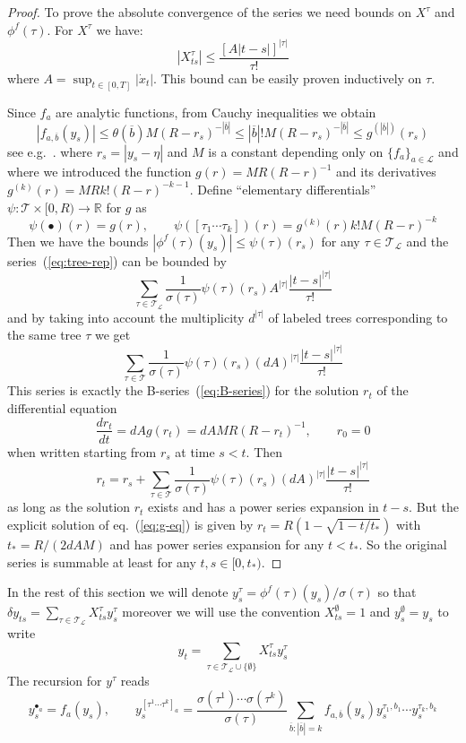 \documentclass[a4paper,11pt,reqno]{article}
\newcommand{\ol}[1]{\overline{#1}}
\newcommand{\1}{{\bf 1}}
\newcommand{\der}{\delta}
\newcommand{\RR}{\mathbb{R}}
\newcommand{\LL}{\mathcal{L}}
\newcommand{\TT}{\mathcal{T}}
\newcommand{\troot}{\bullet}
\begin{document}
\begin{proof}
To prove the absolute convergence of the series we need bounds on $X^\tau$ and $\phi^f(\tau)$. For  $X^\tau$ we have:
$$
|X^{\tau}_{ts}| \le \frac{[A|t-s|]^{|\tau|}}{\tau!}
$$
where $A = \sup_{t\in[0,T]} |\dot x_t|$. This bound can be easily proven inductively on $\tau$.

Since $f_a$ are analytic functions, from Cauchy inequalities we obtain
$$
|f_{a,\ol b}(y_s)| \le \theta(\ol b) M  (R-r_s)^{-|\ol b|} \le |\ol b|! M (R-r_s)^{-|\ol b|} \le g^{(|\ol b|)}(r_s)
$$
see e.g.~\cite[pag. 47]{MR1227985}.
where $r_s = |y_s-\eta|$ and $M$ is a constant depending only on $\{f_a\}_{a\in \LL}$ and where we introduced the function $g(r) = M R (R-r)^{-1}$ and its derivatives $g^{(k)}(r) = MR k! (R-r)^{-k-1}$.
Define ``elementary differentials'' $\psi:\TT \times [0,R) \to \RR$ for $g$ as
$$
\psi(\troot)(r) = g(r), \qquad \psi([\tau_1 \cdots \tau_k])(r) = g^{(k)}(r) k! M (R-r)^{-k} 
$$
Then we have the bounds $|\phi^f(\tau)(y_s)| \le \psi(\tau)(r_s)$ for
any $\tau \in \TT_\LL$ and the series~(\ref{eq:tree-rep}) can be
bounded by
$$
 \sum_{\tau \in \TT_\LL} \frac{1}{\sigma(\tau)} \psi(\tau)(r_s) A^{|\tau|} \frac{|t-s|^{|\tau|}}{\tau!} 
$$
and by taking into account the multiplicity $d^{|\tau|}$ of labeled
trees corresponding to the same tree  $\tau$ we get 
$$
\sum_{\tau \in \TT} \frac{1}{\sigma(\tau)} \psi(\tau)(r_s) (dA)^{|\tau|} \frac{|t-s|^{|\tau|}}{\tau!} 
$$
This series is exactly the B-series~(\ref{eq:B-series}) for the solution $r_t$ of the differential equation 
\begin{equation}
\label{eq:g-eq}
\frac{dr_t}{dt} = dA g(r_t) = d A M R (R-r_t)^{-1}, \qquad r_0 = 0
\end{equation}
when written starting from $r_s$ at time $s< t$. 
Then 
$$
r_t = r_s+ \sum_{\tau \in \TT} \frac{1}{\sigma(\tau)} \psi(\tau)(r_s) (dA)^{|\tau|} \frac{|t-s|^{|\tau|}}{\tau!}
$$
as long as the solution $r_t$ exists and has a power series expansion in $t-s$. But the explicit solution of eq.~(\ref{eq:g-eq}) is given by
$r_t = R(1-\sqrt{1-t/t_*})$ with $t_* = R/(2dAM)$ and has power series expansion for any $t < t_*$.
So the original series is summable at least for any $t,s \in [0,t_*)$.  
\end{proof}

In the rest of this section we will denote $y^\tau_s = \phi^f(\tau)(y_s)/\sigma(\tau)$ so that
$
\der y_{ts} = \sum_{\tau \in \TT_\LL} X^\tau_{ts} y^\tau_s
$
moreover we will use the convention $X^{\emptyset}_{ts} = 1$ and $y^\emptyset_s = y_s$ to write
$$
y_t = \sum_{\tau \in \TT_\LL \cup \{ \emptyset \}} X^{\tau}_{ts} y^{\tau}_s
$$
The recursion for $y^\tau$ reads
\begin{equation}
  \label{eq:ytau-rec}
y^{\troot_a}_s = f_a(y_s), \qquad y^{[\tau^1 \cdots \tau^k]_a}_s = \frac{\sigma(\tau^1)\cdots \sigma(\tau^k)}{\sigma(\tau)} \sum_{\ol b: |\ol b|=k} f_{a, \ol b}(y_s) y_s^{\tau_1,b_1} \cdots y_s^{\tau_k,b_k}  
\end{equation}
\end{document}
